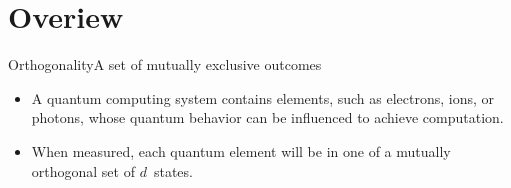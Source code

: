 
\section{Overiew}

\begin{frame}{Orthogonality}{A set of mutually exclusive outcomes}
\begin{itemize}
    \item A quantum computing system contains elements, such as electrons, ions, or photons, whose quantum behavior can be influenced to achieve computation.
    \item When measured, each quantum element will be in one of a mutually orthogonal set of $d$~states.
    
\end{itemize}
\end{frame}


